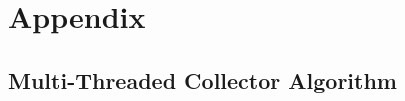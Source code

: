 \documentclass{article}
\begin{document}
\vspace{0.9em}
%


\pagebreak
\singlespacing
\appendix
\section{Appendix}
\subsection{Multi-Threaded Collector Algorithm}
\vspace{0.5em}

\pagebreak
%



\end{document}
